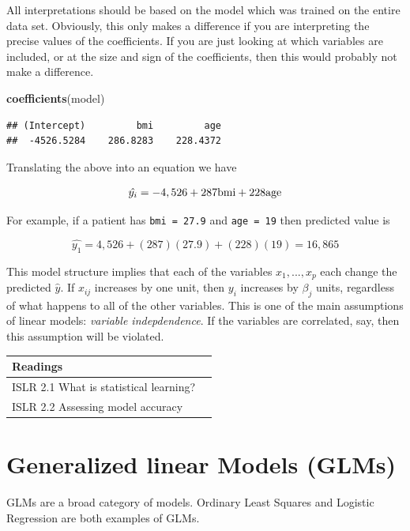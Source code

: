 \documentclass[
  openany]{book}
\newenvironment{Shaded}{\begin{snugshade}}{\end{snugshade}}
\newcommand{\KeywordTok}[1]{\textcolor[rgb]{0.13,0.29,0.53}{\textbf{#1}}}
\newcommand{\NormalTok}[1]{#1}
\begin{document}
All interpretations should be based on the model which was trained on the entire data set. Obviously, this only makes a difference if you are interpreting the precise values of the coefficients. If you are just looking at which variables are included, or at the size and sign of the coefficients, then this would probably not make a difference.

\begin{Shaded}
\begin{Highlighting}[]
\KeywordTok{coefficients}\NormalTok{(model)}
\end{Highlighting}
\end{Shaded}

\begin{verbatim}
## (Intercept)         bmi         age 
##  -4526.5284    286.8283    228.4372
\end{verbatim}

Translating the above into an equation we have

\[\hat{y_i} = -4,526 + 287 \space\text{bmi} + 228\space \text{age}\]

For example, if a patient has \texttt{bmi\ =\ 27.9} and \texttt{age\ =\ 19} then predicted value is

\[\hat{y_1} = 4,526 + (287)(27.9) + (228)(19) = 16,865\]

This model structure implies that each of the variables \(x_1, ..., x_p\) each change the predicted \(\hat{y}\). If \(x_{ij}\) increases by one unit, then \(y_i\) increases by \(\beta_j\) units, regardless of what happens to all of the other variables. This is one of the main assumptions of linear models: \emph{variable indepdendence}. If the variables are correlated, say, then this assumption will be violated.

\begin{longtable}[]{@{}ll@{}}
\toprule
Readings &\tabularnewline
\midrule
\endhead
ISLR 2.1 What is statistical learning? &\tabularnewline
ISLR 2.2 Assessing model accuracy &\tabularnewline
\bottomrule
\end{longtable}

\hypertarget{generalized-linear-models-glms}{%
\chapter{Generalized linear Models (GLMs)}\label{generalized-linear-models-glms}}

GLMs are a broad category of models. Ordinary Least Squares and Logistic Regression are both examples of GLMs.
\end{document}
